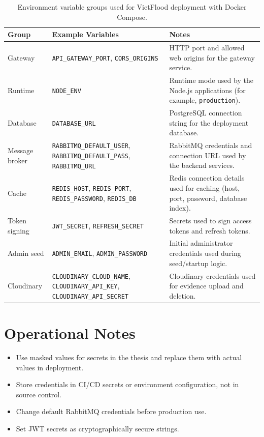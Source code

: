 \begin{table}[H]
\centering
\caption{Environment variable groups used for VietFlood deployment with Docker Compose.}
\label{tab:deployment-config-groups}
\scriptsize
\setlength{\tabcolsep}{4pt}
\renewcommand{\arraystretch}{1.1}
\begin{tabularx}{\textwidth}{|p{2.6cm}|>{\raggedright\arraybackslash}X|>{\raggedright\arraybackslash}p{4.2cm}|}
\hline
\textbf{Group} & \textbf{Example Variables} & \textbf{Notes} \\
\hline
Gateway & \texttt{API\_GATEWAY\_PORT}, \texttt{CORS\_ORIGINS} & HTTP port and allowed web origins for the gateway service. \\
\hline
Runtime & \texttt{NODE\_ENV} & Runtime mode used by the Node.js applications (for example, \texttt{production}). \\
\hline
Database & \texttt{DATABASE\_URL} & PostgreSQL connection string for the deployment database. \\
\hline
Message broker & \texttt{RABBITMQ\_DEFAULT\_USER}, \texttt{RABBITMQ\_DEFAULT\_PASS}, \texttt{RABBITMQ\_URL} & RabbitMQ credentials and connection URL used by the backend services. \\
\hline
Cache & \texttt{REDIS\_HOST}, \texttt{REDIS\_PORT}, \texttt{REDIS\_PASSWORD}, \texttt{REDIS\_DB} & Redis connection details used for caching (host, port, password, database index). \\
\hline
Token signing & \texttt{JWT\_SECRET}, \texttt{REFRESH\_SECRET} & Secrets used to sign access tokens and refresh tokens. \\
\hline
Admin seed & \texttt{ADMIN\_EMAIL}, \texttt{ADMIN\_PASSWORD} & Initial administrator credentials used during seed/startup logic. \\
\hline
Cloudinary & \texttt{CLOUDINARY\_CLOUD\_NAME}, \texttt{CLOUDINARY\_API\_KEY}, \texttt{CLOUDINARY\_API\_SECRET} & Cloudinary credentials used for evidence upload and deletion. \\
\hline
\end{tabularx}
\end{table}

\section{Operational Notes}

\begin{itemize}
    \item Use masked values for secrets in the thesis and replace them with actual values in deployment.
    \item Store credentials in CI/CD secrets or environment configuration, not in source control.
    \item Change default RabbitMQ credentials before production use.
    \item Set JWT secrets as cryptographically secure strings.
\end{itemize}

\endgroup
